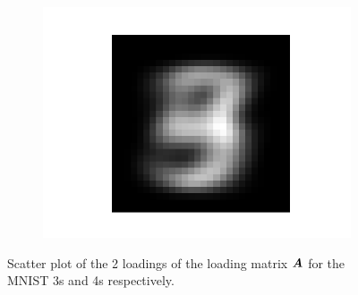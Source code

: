 \begin{figure}
\begin{subfigure}{0.3\linewidth}
    \end{subfigure}
    \begin{subfigure}{0.3\linewidth}
        \includegraphics[width=.5\linewidth]{Pics/05_methodology/general.png}
    \end{subfigure}
    \caption{Scatter plot of the 2 loadings of the loading matrix $\boldsymbol{A}$ for the MNIST 3s and 4s respectively.}
    \label{fig:my_label}
\end{figure}
